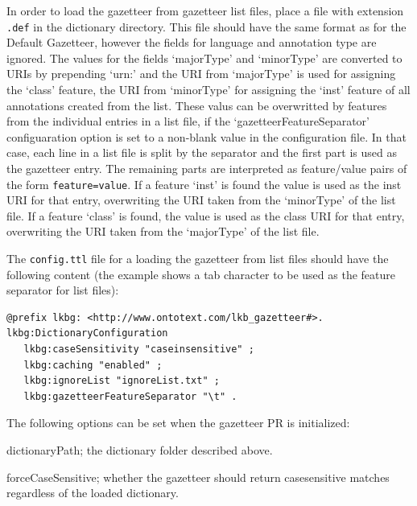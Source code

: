 In order to load the gazetteer from gazetteer list files,
place a file with extension \texttt{.def} in the dictionary
directory. This file should have the same format as for
the Default Gazetteer, however the fields for language and
annotation type are ignored. The values for the fields
`majorType' and `minorType' are converted to URIs by 
prepending `urn:' and the URI from `majorType' is used for
assigning the `class' feature, the URI from `minorType'
for assigning the `inst' feature of all annotations created
from the list. These valus can be overwritted by features
from the individual entries in a list file, if the
`gazetteerFeatureSeparator' configuaration option is set
to a non-blank value in the configuration file. In that
case, each line in a list file is split by the separator
and the first part is used as the gazetteer entry. The 
remaining parts are interpreted as feature/value pairs
of the form \texttt{feature=value}. If a feature `inst'
is found the value is used as the inst URI for that entry,
overwriting the URI taken from the `minorType' of the list
file. If a feature `class' is found, the value is used as
the class URI for that entry, overwriting the URI taken from
the `majorType' of the list file.

The \texttt{config.ttl} file for a loading the gazetteer
from list files should have the following content (the example
shows a tab character to be used as the feature separator
for list files):

\begin{pverbatimbox}
\begin{small}\begin{verbatim}
@prefix lkbg: <http://www.ontotext.com/lkb_gazetteer#>.
lkbg:DictionaryConfiguration 
   lkbg:caseSensitivity "caseinsensitive" ;
   lkbg:caching "enabled" ;
   lkbg:ignoreList "ignoreList.txt" ;
   lkbg:gazetteerFeatureSeparator "\t" .
\end{verbatim}\end{small}
\end{pverbatimbox}




The following options can be set when the gazetteer PR is initialized:

\begin{plist}

\item{} dictionaryPath; the dictionary folder described above.

\item{} forceCaseSensitive; whether the gazetteer should return
casesensitive matches regardless of the loaded dictionary.

\end{plist}

